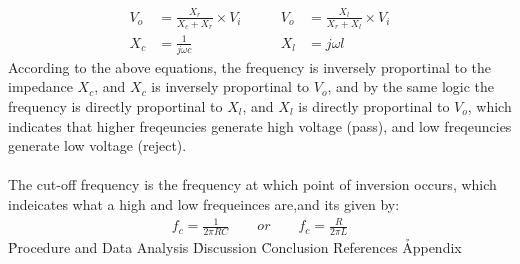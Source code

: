 \documentclass[12pt]{article}
\begin{document}
\begin{equation}
    \begin{aligned}
                V_o &= \frac{X_r}{X_c + X_r} \times V_i  \quad\quad &V_o &= \frac{X_l}{X_r + X_l} \times V_i\\
                X_c &= \frac{1}{j\omega c}  &X_l &= j\omega l
    \end{aligned}
    \end{equation}
According to the above equations, the frequency is inversely proportinal to the impedance $X_c$, and $X_c$ is inversely proportinal to $V_o$, and by the same logic the frequency is directly proportinal to $X_l$, and $X_l$ is directly proportinal to $V_o$, which indicates that higher freqeuncies generate high voltage (pass), and low freqeuncies generate low voltage (reject).\\ \\
The cut-off frequency is the frequency at which point of inversion occurs, which indeicates what a high and low frequeinces are,and its given by:
\begin{equation}
    \begin{aligned}
        f_c = \frac{1}{2\pi R C} \quad\quad or \quad\quad f_c = \frac{R}{2\pi L}
    \end{aligned}
\end{equation}
\h{Procedure and Data Analysis}
\h{Discussion}
\h{Conclusion}
\h{References}
\h{Appendix}
\end{document}
